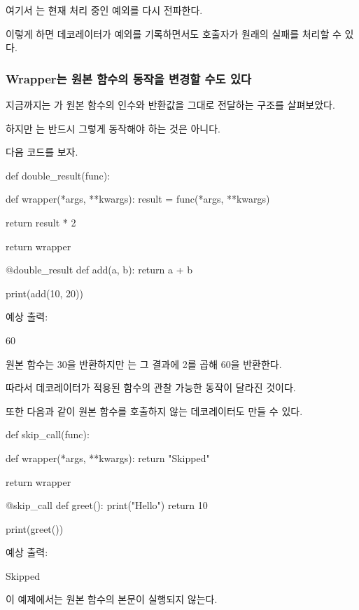 여기서 는 현재 처리 중인 예외를 다시 전파한다.

이렇게 하면 데코레이터가 예외를 기록하면서도 호출자가 원래의 실패를 처리할 수 있다.

\subsubsection{Wrapper는 원본 함수의 동작을 변경할 수도 있다}

지금까지는 가 원본 함수의 인수와 반환값을 그대로 전달하는 구조를 살펴보았다.

하지만 는 반드시 그렇게 동작해야 하는 것은 아니다.

다음 코드를 보자.

\begin{dhkcode}
def double_result(func):

    def wrapper(*args, **kwargs):
        result = func(*args, **kwargs)

        return result * 2

    return wrapper


@double_result
def add(a, b):
    return a + b


print(add(10, 20))
\end{dhkcode}

예상 출력:

\begin{dhkzsh}
60
\end{dhkzsh}

원본 함수는 30을 반환하지만 는 그 결과에 2를 곱해 60을 반환한다.

따라서 데코레이터가 적용된 함수의 관찰 가능한 동작이 달라진 것이다.

또한 다음과 같이 원본 함수를 호출하지 않는 데코레이터도 만들 수 있다.

\begin{dhkcode}
def skip_call(func):

    def wrapper(*args, **kwargs):
        return "Skipped"

    return wrapper


@skip_call
def greet():
    print("Hello")
    return 10


print(greet())
\end{dhkcode}

예상 출력:

\begin{dhkzsh}
Skipped
\end{dhkzsh}

이 예제에서는 원본  함수의 본문이 실행되지 않는다.

